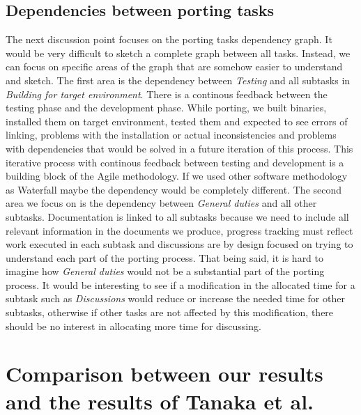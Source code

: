 \subsection{Dependencies between porting tasks}

The next discussion point focuses on the porting tasks dependency graph. It
would be very difficult to sketch a complete graph between all tasks. Instead, we
can focus on specific areas of the graph that are somehow easier to understand
and sketch. The first area is the dependency between \textit{Testing} and all
subtasks in \textit{Building for target environment}. There is a continous
feedback between the testing phase and the development phase. While porting, we
built binaries, installed them on target environment, tested them and expected
to see errors of linking, problems with the installation or actual
inconsistencies and problems with dependencies that would be solved in a future
iteration of this process. This iterative process with continous feedback
between testing and development is a building block of the Agile methodology. If
we used other software methodology as Waterfall maybe the dependency would be
completely different. The second area we focus on is the dependency between
\textit{General duties} and all other subtasks. Documentation is linked to all
subtasks because we need to include all relevant information in the documents we
produce, progress tracking must reflect work executed in each subtask and
discussions are by design focused on trying to understand each part of the
porting process. That being said, it is hard to imagine how \textit{General
duties} would not be a substantial part of the porting process. It would be
interesting to see if a modification in the allocated time for a subtask such
as \textit{Discussions} would reduce or increase the needed time for other
subtasks, otherwise if other tasks are not affected by this modification, there
should be no interest in allocating more time for discussing.

\section{Comparison between our results and the results of Tanaka et al.}

